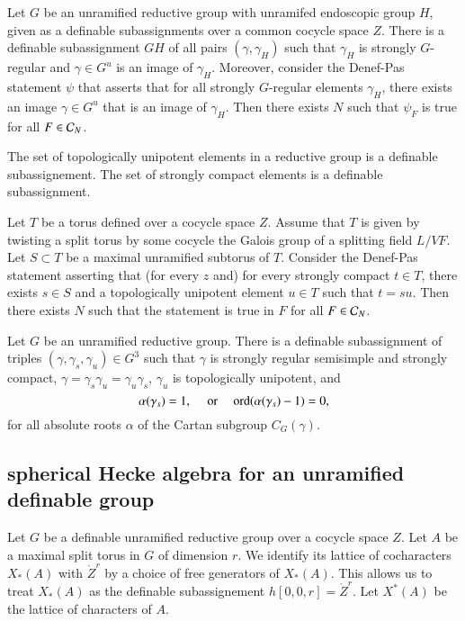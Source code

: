 \begin{lemma} Let $G$ be an unramified reductive group with unramifed endoscopic group $H$, given as a definable subassignments over a common cocycle space $Z$.
There is a definable subassignment $GH$ of all pairs $(\gamma,\gamma_H)$ such that $\gamma_H$ is strongly $G$-regular and $\gamma\in G^u$ is an image of $\gamma_H$.
Moreover,
consider the Denef-Pas statement $\psi$ that asserts that for all strongly $G$-regular elements $\gamma_H$, there exists an image $\gamma\in G^u$ that is an image of $\gamma_H$.
Then there exists $N$ such that $\psi_F$ is true for all $F\in\mathcal C_N$.
\end{lemma}

\begin{lemma} The set of topologically unipotent elements in a reductive group is a definable subassignement.
The set of strongly compact elements is a definable subassignment.
\end{lemma}

\begin{lemma} Let $T$ be a torus defined over a cocycle space $Z$. Assume that $T$ is given by twisting a split torus by some cocycle the Galois group
of a splitting field $L/VF$.  Let $S\subset T$ be a maximal unramified subtorus of $T$.  Consider the Denef-Pas statement asserting that (for every $z$ and) for
every strongly compact $t\in T$, 
there exists $s\in S$ and a topologically unipotent element $u\in T$ such that $t =s u$.  Then there exists $N$ such that the statement is
true in $F$ for all $F\in \mathcal C_N$.
\end{lemma}

\begin{lemma} 
Let $G$ be an unramified reductive group.  There is a definable subassignment of triples $(\gamma,\gamma_s,\gamma_u)\in G^3$
 such that $\gamma$ is strongly regular semisimple and strongly compact, 
$\gamma = \gamma_s \gamma_u = \gamma_u\gamma_s$, $\gamma_u$ is topologically unipotent, and
\[
\alpha(\gamma_s)=1,\quad\text{ or }\quad {\operatorname{ord}}(\alpha(\gamma_s)-1)=0,
\]
for all absolute roots $\alpha$ of the Cartan subgroup $C_G(\gamma)$.
\end{lemma}


\subsection{spherical Hecke algebra for an unramified definable group}

Let $G$ be a definable unramified reductive group over a cocycle space $Z$.  Let $A$ be a maximal split torus in $G$ of dimension
$r$.  We identify its lattice of cocharacters $X_*(A)$ with $\ring{Z}^r$ by a choice of free generators of $X_*(A)$.
This allows us to treat $X_*(A)$ as the definable subassignement $h[0,0,r] = \ring{Z}^r$.  Let $X^*(A)$ be the lattice of
characters of $A$.

